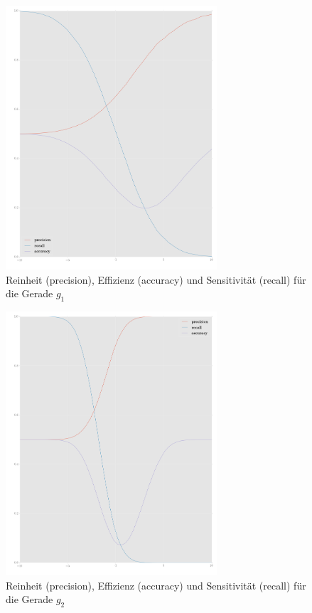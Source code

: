 \begin{figure}
	\centering
	\includegraphics[width=0.7\textwidth]{performace_g1.png}
	\caption{Reinheit (precision), Effizienz (accuracy) und Sensitivität (recall) für die Gerade $g_1$}
\end{figure}
\begin{figure}
	\centering
	\includegraphics[width=0.7\textwidth]{performace_g2.png}
	\caption{Reinheit (precision), Effizienz (accuracy) und Sensitivität (recall) für die Gerade $g_2$}
\end{figure}

